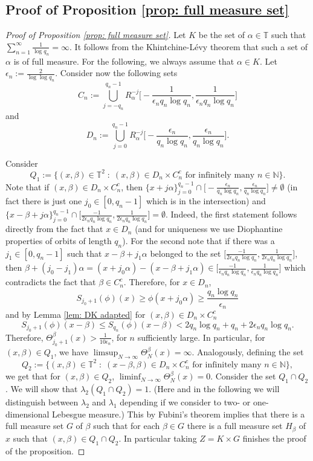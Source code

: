 \documentclass[11pt]{amsart}
\theoremstyle{definition}
\numberwithin{equation}{section}
\def\T{\mathbb{T}}
\def\N{\mathbb{N}}
\begin{document}
\subsection{Proof of Proposition \ref{prop: full measure set}}
\begin{proof}[Proof of Proposition \ref{prop: full measure set}] Let $K$ be the set of $\alpha\in \T$ such that $\sum_{n=1}^\infty \frac{1}{\log q_n}=\infty$. It follows from the Khintchine-L\'evy theorem that such a set of $\alpha$ is of full measure. For the following, we always assume that $\alpha\in K$. Let $\epsilon_n:=\frac{2}{\log \log q_n}$. Consider now the following sets
$$C_n:=\bigcup_{j=-q_n}^{q_n-1} R_\alpha^{-j}\Big[-\frac{1}{\epsilon_n q_n\log q_n},\frac{1}{\epsilon_n q_n\log q_n}\Big]$$ 
and 
$$D_n:=\bigcup_{j=0}^{q_n-1} R_\alpha^{-j}\Big[-\frac{\epsilon_n}{q_n\log q_n},\frac{\epsilon_n}{q_n\log q_n}\Big].$$ 

Consider  
$$
Q_1:=\{(x,\beta)\in \T^2\;:\; (x,\beta)\in D_n\times C_n^c\text{ for infinitely many }n\in \N\}.
$$
Note that if $(x,\beta)\in D_n\times C_n^c$, then $\{x+j\alpha\}_{j=0}^{q_n-1}\cap \Big[-\frac{\epsilon_n}{q_n\log q_n},\frac{\epsilon_n}{q_n\log q_n}\Big]\neq \emptyset$ (in fact there is just one $j_0 \in [0, q_n-1]$ which is in the intersection) and  $\{x-\beta+j\alpha\}_{j=0}^{q_n-1}\cap \Big[\frac{-1}{2\epsilon_nq_n\log q_n},\frac{1}{2\epsilon_nq_n\log q_n}\Big]=\emptyset$. Indeed, the first statement follows directly from the fact that $x\in D_n$ (and for uniqueness we use Diophantine properties of orbits of length $q_n$). For the second note that if there was a $j_1\in [0,q_n-1]$ such that $x-\beta+j_1\alpha$ belonged to the set $\Big[\frac{-1}{2\epsilon_nq_n\log q_n},\frac{1}{2\epsilon_nq_n\log q_n}\Big]$, then  
 $\beta+(j_0-j_1)\alpha=(x+j_0\alpha)-(x-\beta+j_1\alpha)\in \Big[\frac{-1}{\epsilon_nq_n\log q_n},\frac{1}{\epsilon_nq_n\log q_n}\Big]$ which contradicts the fact that $\beta\in C_n^c$. Therefore, for $x\in D_n$,  
$$
S_{j_0+1}(\phi)(x)\geq \phi(x+j_0\alpha)\geq \frac{q_n\log q_n}{\epsilon_n}
$$ 
and by Lemma \ref{lem: DK adapted} for $(x,\beta)\in D_n\times C_n^c$
$$
S_{j_0+1}(\phi)(x-\beta)\leq S_{q_n}(\phi)(x-\beta)< 2q_n\log q_n + q_n+ 2\epsilon_n q_n\log q_n. 
$$
Therefore, $\Theta_{j_0+1}^\beta(x)> \frac{1}{10\epsilon_n}$, for $n$ sufficiently large. In particular, for $(x,\beta)\in  Q_1$, we have $\limsup_{N\to\infty}\Theta_N^\beta(x)=\infty$. Analogously, defining the set 
$$
 Q_2:=\{(x,\beta)\in \T^2\;:\; (x-\beta,\beta)\in D_n\times C_n^c\text{ for infinitely many }n\in \N\},
$$
we get that for $(x,\beta)\in  Q_2$, $\liminf_{N\to\infty}\Theta_N^\beta(x)=0$. Consider the set $Q_1\cap Q_2$. We will show that $\lambda_2( Q_1\cap Q_2)=1$. (Here and in the following we will distinguish between $\lambda_2$ and $\lambda_1$ depending if we consider to two- or one-dimensional Lebesgue measure.) This by Fubini's theorem implies that there is a full measure set $G$ of $\beta$ such that for each $\beta\in G$ there is a full measure set $H_\beta$ of $x$ such that $(x,\beta)\in Q_1\cap Q_2$. In particular taking $Z=K\times G$ finishes the proof of the proposition.


\end{proof}
\end{document}
